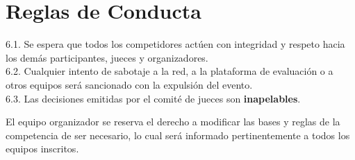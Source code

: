 \documentclass[12pt,a4paper]{article}
\begin{document}
\section{Reglas de Conducta}
6.1. Se espera que todos los competidores actúen con integridad y respeto hacia los demás participantes, jueces y organizadores. \\
6.2. Cualquier intento de sabotaje a la red, a la plataforma de evaluación o a otros equipos será sancionado con la expulsión del evento. \\
6.3. Las decisiones emitidas por el comité de jueces son \textbf{inapelables}.

\vspace{1cm}
\noindent El equipo organizador se reserva el derecho a modificar las bases y reglas de la competencia de ser necesario, lo cual será informado pertinentemente a todos los equipos inscritos.
\end{document}
